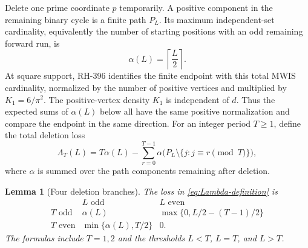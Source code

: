 \documentclass[12pt,a4paper]{article}
\newtheorem{lemma}[theorem]{Lemma}
\theoremstyle{definition}
\begin{document}
Delete one prime coordinate \(p\) temporarily.  A positive component in the
remaining binary cycle is a finite path \(P_L\).  Its maximum independent-set
cardinality, equivalently the number of starting positions with an odd
remaining forward run, is
\begin{equation}
 \alpha(L)=\left\lceil\frac L2\right\rceil.
 \label{eq:alpha}
\end{equation}
At square support, RH-396 identifies the finite endpoint with this total MWIS
cardinality, normalized by the number of positive vertices and multiplied by
\(K_1=6/\pi^2\).  The positive-vertex density \(K_1\) is independent of
\(d\).  Thus the expected sums of \(\alpha(L)\) below all have the same
positive normalization and compare the endpoint in the same direction.
For an integer period \(T\geq1\), define the total deletion loss
\begin{equation}
 \Lambda_T(L)=T\alpha(L)-
 \sum_{r=0}^{T-1}
 \alpha\bigl(P_L\setminus\{j:j\equiv r\pmod T\}\bigr),
 \label{eq:Lambda-definition}
\end{equation}
where \(\alpha\) is summed over the path components remaining after deletion.

\begin{lemma}[Four deletion branches]
\label{lem:Lambda}
The loss in \eqref{eq:Lambda-definition} is
\begin{equation}
\begin{array}{c|c|c}
 &L\text{ odd}&L\text{ even}\\ \hline
T\text{ odd}&
 \alpha(L)&
 \max\{0,L/2-(T-1)/2\}\\[2pt]
T\text{ even}&
 \min\{\alpha(L),T/2\}&0.
\end{array}
\label{eq:Lambda-branches}
\end{equation}
The formulas include \(T=1,2\) and the thresholds \(L<T\), \(L=T\), and
\(L>T\).
\end{lemma}
\end{document}
